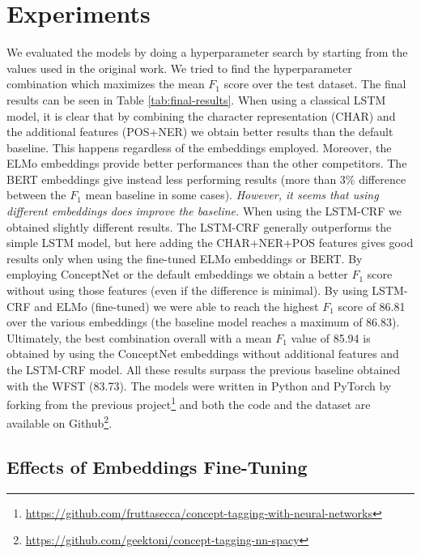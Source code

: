 \documentclass[11pt,a4paper]{article}
\begin{document}
\section{Experiments}

We evaluated the models by doing a hyperparameter search by starting from the values used in the original work. We tried to find the hyperparameter combination which maximizes the mean $F_1$ score over the test dataset. The final results can be seen in Table \ref{tab:final-results}.
When using a classical LSTM model, it is clear that by combining the character representation (CHAR) and the additional features (POS+NER) we obtain better results than the default baseline. This happens regardless of the embeddings employed. Moreover, the ELMo embeddings provide better performances than the other competitors. 
The BERT embeddings give instead less performing results (more than 3\% difference between the $F_1$ mean baseline in some cases). \textit{However, it seems that using different embeddings does improve the baseline.}
When using the LSTM-CRF we obtained slightly different results. The LSTM-CRF generally outperforms the simple LSTM model, but here adding the CHAR+NER+POS features gives good results only when using the fine-tuned ELMo embeddings or BERT. By employing ConceptNet or the default embeddings we obtain a better $F_1$ score without using those features (even if the difference is minimal).
By using LSTM-CRF and ELMo (fine-tuned) we were able to reach the highest $F_1$ score of 86.81 over the various embeddings (the baseline model reaches a maximum of 86.83). Ultimately, the best combination overall with a mean $F_1$ value of 85.94 is obtained by using the ConceptNet embeddings without additional features and the LSTM-CRF model. All these results surpass the previous baseline obtained with the WFST (83.73).
The models were written in Python and PyTorch by forking from the previous project\footnote{\url{https://github.com/fruttasecca/concept-tagging-with-neural-networks}} and both the code and the dataset are available on Github\footnote{\url{https://github.com/geektoni/concept-tagging-nn-spacy}}.

\subsection{Effects of Embeddings Fine-Tuning}
\end{document}

